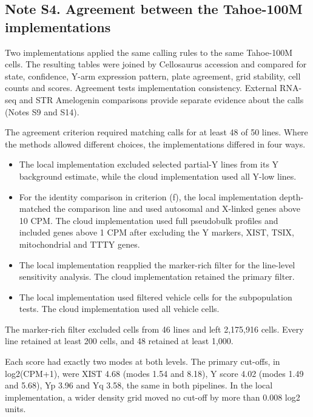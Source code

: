 \documentclass[
  11pt,
  letterpaper,
]{article}
\providecommand{\tightlist}{%
  \setlength{\itemsep}{0pt}\setlength{\parskip}{0pt}}
\begin{document}
\subsection{Note S4. Agreement between the Tahoe-100M
implementations}\label{note-s4.-agreement-between-the-tahoe-100m-implementations}

Two implementations applied the same calling rules to the same
Tahoe-100M cells. The resulting tables were joined by Cellosaurus
accession and compared for state, confidence, Y-arm expression pattern,
plate agreement, grid stability, cell counts and scores. Agreement tests
implementation consistency. External RNA-seq and STR Amelogenin
comparisons provide separate evidence about the calls (Notes S9 and
S14).

The agreement criterion required matching calls for at least 48 of 50
lines. Where the methods allowed different choices, the implementations
differed in four ways.

\begin{itemize}
\tightlist
\item
  The local implementation excluded selected partial-Y lines from its Y
  background estimate, while the cloud implementation used all Y-low
  lines.
\item
  For the identity comparison in criterion (f), the local implementation
  depth-matched the comparison line and used autosomal and X-linked
  genes above 10 CPM. The cloud implementation used full pseudobulk
  profiles and included genes above 1 CPM after excluding the Y markers,
  XIST, TSIX, mitochondrial and TTTY genes.
\item
  The local implementation reapplied the marker-rich filter for the
  line-level sensitivity analysis. The cloud implementation retained the
  primary filter.
\item
  The local implementation used filtered vehicle cells for the
  subpopulation tests. The cloud implementation used all vehicle cells.
\end{itemize}

The marker-rich filter excluded cells from 46 lines and left 2,175,916
cells. Every line retained at least 200 cells, and 48 retained at least
1,000.

Each score had exactly two modes at both levels. The primary cut-offs,
in log2(CPM+1), were XIST 4.68 (modes 1.54 and 8.18), Y score 4.02
(modes 1.49 and 5.68), Yp 3.96 and Yq 3.58, the same in both pipelines.
In the local implementation, a wider density grid moved no cut-off by
more than 0.008 log2 units.
\end{document}
